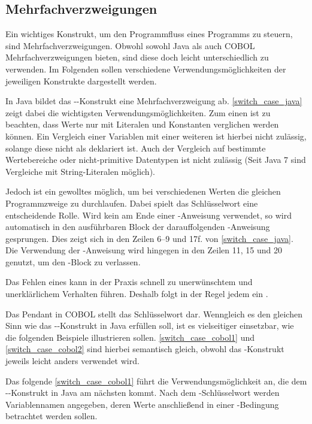 \subsection{Mehrfachverzweigungen}\label{mehrfachverzweigungen}
Ein wichtiges Konstrukt, um den Programmfluss eines Programms zu steuern, sind Mehrfachverzweigungen. Obwohl sowohl Java als auch COBOL Mehrfachverzweigungen bieten, sind diese doch leicht unterschiedlich zu verwenden. Im Folgenden sollen verschiedene Verwendungsmöglichkeiten der jeweiligen Konstrukte dargestellt werden.

In Java bildet das --Konstrukt eine Mehrfachverzweigung ab. \autoref{switch_case_java} zeigt dabei die wichtigsten Verwendungsmöglichkeiten.
Zum einen ist zu beachten, dass Werte nur mit Literalen und Konstanten verglichen werden können. Ein Vergleich einer Variablen mit einer weiteren ist hierbei nicht zulässig, solange diese nicht als  deklariert ist. Auch der Vergleich auf bestimmte Wertebereiche oder nicht-primitive Datentypen ist nicht zulässig (Seit Java 7 sind Vergleiche mit String-Literalen möglich).

Jedoch ist ein gewolltes  möglich, um bei verschiedenen Werten die gleichen Programmzweige zu durchlaufen. Dabei spielt das Schlüsselwort  eine entscheidende Rolle. Wird kein  am Ende einer -Anweisung verwendet, so wird automatisch in den ausführbaren Block der darauffolgenden -Anweisung gesprungen. Dies zeigt sich in den Zeilen 6--9 und 17f. von \autoref{switch_case_java}. Die Verwendung der -Anweisung wird hingegen in den Zeilen 11, 15 und 20 genutzt, um den -Block zu verlassen.
 
Das Fehlen eines  kann in der Praxis schnell zu unerwünschtem und unerklärlichem Verhalten führen. Deshalb folgt in der Regel jedem  ein . 

Das Pendant in COBOL stellt das Schlüsselwort  dar. Wenngleich es den gleichen Sinn wie das --Konstrukt in Java erfüllen soll, ist es vielseitiger einsetzbar, wie die folgenden Beispiele illustrieren sollen. \autoref{switch_case_cobol1} und \autoref{switch_case_cobol2} sind hierbei semantisch gleich, obwohl das -Konstrukt jeweils leicht anders verwendet wird.

Das folgende \autoref{switch_case_cobol1} führt die Verwendungsmöglichkeit an, die dem --Konstrukt in Java am nächsten kommt. Nach dem -Schlüsselwort werden Variablennamen angegeben, deren Werte anschließend in einer -Bedingung betrachtet werden sollen.

